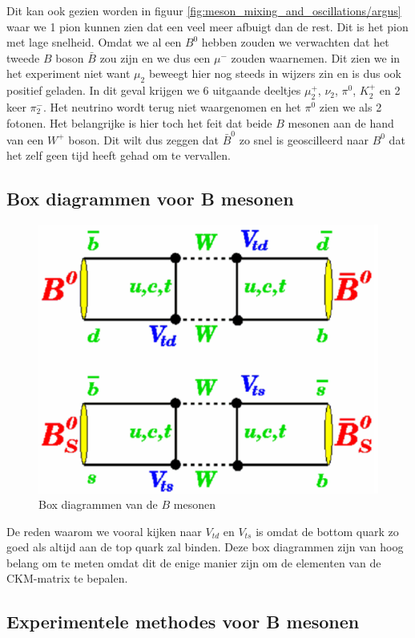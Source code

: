 \documentclass[../main.tex]{subfiles}
\begin{document}
Dit kan ook gezien worden in figuur \ref{fig:meson_mixing_and_oscillations/argus} waar we 1 pion kunnen zien dat een veel meer afbuigt dan de rest. Dit is het pion met lage snelheid. Omdat we al een $B^0$ hebben zouden we verwachten dat het tweede $B$ boson $\bar{B}$ zou zijn en we dus een $\mu^-$ zouden waarnemen. Dit zien we in het experiment niet want $\mu_2$ beweegt hier nog steeds in wijzers zin en is dus ook positief geladen. In dit geval krijgen we 6 uitgaande deeltjes $\mu_2^+$, $\nu_2$, $\pi^0$, $K_2^+$ en 2 keer $\pi_2^-$. Het neutrino wordt terug niet waargenomen en het $\pi^0$ zien we als 2 fotonen. Het belangrijke is hier toch het feit dat beide $B$ mesonen aan de hand van een $W^+$ boson. Dit wilt dus zeggen dat $\bar{B}^0$ zo snel is geoscilleerd naar $B^0$ dat het zelf geen tijd heeft gehad om te vervallen.

\subsection{Box diagrammen voor B mesonen}%
\label{sub:box_diagrammen_voor_b_mesonen}

\begin{figure}[h]
    \centering
    \includegraphics[width=0.5\linewidth]{meson_mixing_and_oscillations/box_diagr_b.png}
    \caption{Box diagrammen van de $B$ mesonen}%
    \label{fig:meson_mixing_and_oscillations/box_diagr_b}
\end{figure}

De reden waarom we vooral kijken naar $V_{td}$ en $V_{ts}$ is omdat de bottom quark zo goed als altijd aan de top quark zal binden. Deze box diagrammen zijn van hoog belang om te meten omdat dit de enige manier zijn om de elementen van de CKM-matrix te bepalen.

\subsection{Experimentele methodes voor B mesonen}%
\label{sub:experimentele_methodes_voor_b_mesonen}
\end{document}
